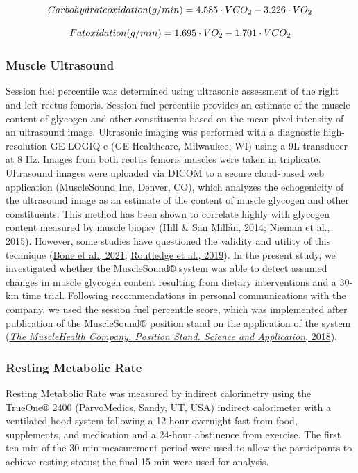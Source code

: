 \documentclass[]{cik}%
\begin{document}
\[
Carbohydrate \space oxidation \space (g/min) = 4.585 \cdot VCO_2 - 3.226 \cdot VO_2 
\]

\[
Fat \space oxidation \space (g/min) = 1.695 \cdot VO_2 - 1.701 \cdot VCO_2
\]

\hypertarget{muscle-ultrasound}{%
\subsubsection{Muscle Ultrasound}\label{muscle-ultrasound}}

Session fuel percentile was determined using ultrasonic assessment of
the right and left rectus femoris. Session fuel percentile provides an
estimate of the muscle content of glycogen and other constituents based
on the mean pixel intensity of an ultrasound image. Ultrasonic imaging
was performed with a diagnostic high-resolution GE LOGIQ-e (GE
Healthcare, Milwaukee, WI) using a 9L transducer at 8 Hz. Images from
both rectus femoris muscles were taken in triplicate. Ultrasound images
were uploaded via DICOM to a secure cloud-based web application
(MuscleSound Inc, Denver, CO), which analyzes the echogenicity of the
ultrasound image as an estimate of the content of muscle glycogen and
other constituents. This method has been shown to correlate highly with
glycogen content measured by muscle biopsy
(\protect\hyperlink{ref-29}{Hill \& San Millán, 2014};
\protect\hyperlink{ref-44}{Nieman et al., 2015}). However, some studies
have questioned the validity and utility of this technique
(\protect\hyperlink{ref-45}{Bone et al., 2021};
\protect\hyperlink{ref-46}{Routledge et al., 2019}). In the present
study, we investigated whether the MuscleSound® system was able to
detect assumed changes in muscle glycogen content resulting from dietary
interventions and a 30-km time trial. Following recommendations in
personal communications with the company, we used the session fuel
percentile score, which was implemented after publication of the
MuscleSound® position stand on the application of the system
(\protect\hyperlink{ref-47}{\emph{The MuscleHealth Company. Position
Stand. Science and Application}, 2018}).

\hypertarget{resting-metabolic-rate}{%
\subsubsection{Resting Metabolic Rate}\label{resting-metabolic-rate}}

Resting Metabolic Rate was measured by indirect calorimetry using the
TrueOne® 2400 (ParvoMedics, Sandy, UT, USA) indirect calorimeter with a
ventilated hood system following a 12-hour overnight fast from food,
supplements, and medication and a 24-hour abstinence from exercise. The
first ten min of the 30 min measurement period were used to allow the
participants to achieve resting status; the final 15 min were used for
analysis.
\end{document}
